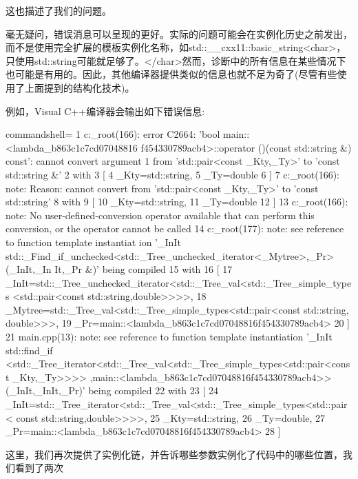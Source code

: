这也描述了我们的问题。

毫无疑问，错误消息可以呈现的更好。实际的问题可能会在实例化历史之前发出，而不是使用完全扩展的模板实例化名称，如std::\_\_cxx11::basic\_string<char>，只使用std::string可能就足够了。</char>然而，诊断中的所有信息在某些情况下也可能是有用的。因此，其他编译器提供类似的信息也就不足为奇了(尽管有些使用了上面提到的结构化技术)。

例如，Visual C++编译器会输出如下错误信息:

{\scriptsize
\begin{tcblisting}{commandshell={}}
1  c:\tools_root\cl\inc\algorithm(166): error C2664: ’bool main::<lambda_b863c1c7cd07048816
   f454330789acb4>::operator ()(const std::string &) const’: cannot convert argument 1 from
   ’std::pair<const _Kty,_Ty>’ to ’const std::string &’
2          with
3          [
4              _Kty=std::string,
5              _Ty=double
6          ]
7  c:\tools_root\cl\inc\algorithm(166): note: Reason: cannot convert from ’std::pair<const
   _Kty,_Ty>’ to ’const std::string’
8          with
9          [
10             _Kty=std::string,
11             _Ty=double
12         ]
13 c:\tools_root\cl\inc\algorithm(166): note: No user-defined-conversion operator available
   that can perform this conversion, or the operator cannot be called
14 c:\tools_root\cl\inc\algorithm(177): note: see reference to function template instantiat
   ion ’_InIt std::_Find_if_unchecked<std::_Tree_unchecked_iterator<_Mytree>,_Pr>(_InIt,_In
   It,_Pr &)’ being compiled
15         with
16         [
17              _InIt=std::_Tree_unchecked_iterator<std::_Tree_val<std::_Tree_simple_types
                <std::pair<const std::string,double>>>>,
18              _Mytree=std::_Tree_val<std::_Tree_simple_types<std::pair<const std::string,
                double>>>,
19              _Pr=main::<lambda_b863c1c7cd07048816f454330789acb4>
20         ]
21 main.cpp(13): note: see reference to function template instantiation ’_InIt std::find_if
   <std::_Tree_iterator<std::_Tree_val<std::_Tree_simple_types<std::pair<const _Kty,_Ty>>>>
   ,main::<lambda_b863c1c7cd07048816f454330789acb4>>(_InIt,_InIt,_Pr)’ being compiled
22         with
23         [
24             _InIt=std::_Tree_iterator<std::_Tree_val<std::_Tree_simple_types<std::pair<
               const std::string,double>>>>,
25             _Kty=std::string,
26             _Ty=double,
27             _Pr=main::<lambda_b863c1c7cd07048816f454330789acb4>
28         ]
\end{tcblisting}
}

这里，我们再次提供了实例化链，并告诉哪些参数实例化了代码中的哪些位置，我们看到了两次

